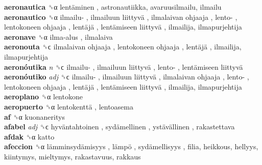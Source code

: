 \textbf{aeronautica} ␝α   lentäminen , astronautiikka, avaruusilmailu, ilmailu  \\
\textbf{aeronautico} ␝α   ilmailu- ,  ilmailuun liittyvä ,  ilmalaivan ohjaaja ,  lento- ,  lentokoneen ohjaaja ,  lentäjä ,  lentämiseen liittyvä , ilmailija, ilmapurjehtija  \\
\textbf{aeronave} ␝α   ilma-alus , ilmalaiva  \\
\textbf{aeronouta} ␝ϲ   ilmalaivan ohjaaja ,  lentokoneen ohjaaja ,  lentäjä , ilmailija, ilmapurjehtija  \\
\textbf{aeronóutika} \emph{n}  ␝ϲ   ilmailu- ,  ilmailuun liittyvä ,  lento- ,  lentämiseen liittyvä   \\
\textbf{aeronóutiko} \emph{adj}  ␝ϲ   ilmailu- ,  ilmailuun liittyvä ,  ilmalaivan ohjaaja ,  lento- ,  lentokoneen ohjaaja ,  lentäjä ,  lentämiseen liittyvä , ilmailija, ilmapurjehtija  \\
\textbf{aeroplano} ␝α  lentokone  \\
\textbf{aeropuerto} ␝α   lentokenttä , lentoasema  \\
\textbf{af} ␝α  kuonaneritys  \\
\textbf{afabel} \emph{adj}  ␝ϲ   hyväntahtoinen ,  sydämellinen ,  ystävällinen , rakastettava  \\
\textbf{afdak} ␝α  katto  \\
\textbf{afeccion} ␝α   lämminsydämisyys ,  lämpö ,  sydämellisyys , filia, heikkous, hellyys, kiintymys, mieltymys, rakastavuus, rakkaus  \\
